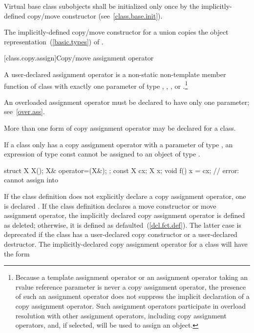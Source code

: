 %
Virtual base class subobjects shall be initialized only once by
the implicitly-defined copy/move constructor (see~\ref{class.base.init}).

\pnum
The implicitly-defined copy/move constructor for a union
 copies the object representation~(\ref{basic.types}) of .%
%


[class.copy.assign]{Copy/move assignment operator}%

\pnum
{}%
%
A user-declared  assignment operator  is a
non-static non-template member function of class  with exactly one
parameter of type , ,  ,
  or  
.\footnote{Because a template assignment operator or an assignment
operator taking an rvalue reference parameter is never a copy assignment
operator, the presence of such an assignment operator does not suppress the
implicit declaration of a copy assignment operator. Such assignment operators
participate in overload resolution with other assignment operators, including
copy assignment operators, and, if selected, will be used to assign an object.}
\begin{note}
An overloaded assignment operator must be declared to have only one parameter;
see~\ref{over.ass}.
\end{note}
\begin{note}
More than one form of copy assignment operator may be declared for a class.
\end{note}
\begin{note}
If a class
only has a copy assignment operator with a parameter of type
,
an expression of type const
cannot be assigned to an object of type
.
\begin{example}

\begin{codeblock}
struct X {
  X();
  X& operator=(X&);
};
const X cx;
X x;
void f() {
  x = cx;           // error:  cannot assign  into 
}
\end{codeblock}
\end{example}
\end{note}

\pnum
{}%
If the class definition does not explicitly declare a copy assignment operator,
one is declared . If the class definition declares a move
constructor or move assignment operator, the implicitly declared copy
assignment operator is defined as deleted; otherwise, it is defined as
defaulted~(\ref{dcl.fct.def}).
The latter case is deprecated if the class has a user-declared copy constructor
or a user-declared destructor.
The implicitly-declared copy assignment operator for a class
will have the form

